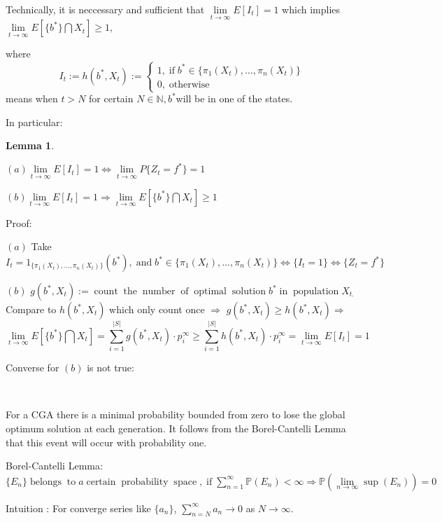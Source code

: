 \documentclass{article}
\newcommand{\assign}{:=}
\newcommand{\tmop}[1]{\ensuremath{\operatorname{#1}}}
\newtheorem{lemma}{Lemma}
{\theorembodyfont{\rmfamily}\newtheorem{note}{Note}}
{\theorembodyfont{\rmfamily}\newtheorem{remark}{Remark}}
\begin{document}
Technically, it is neccessary and sufficient that $\underset{t \rightarrow
\infty}{\lim} E [I_t] = 1$ which implies $\underset{t \rightarrow
\infty}{\lim} E \left[ \{ b^{\ast} \} \bigcap X_t \right] \geqslant 1,$

where
\begin{equation}
  I_t \assign h (b^{\ast}, X_t) \assign \left\{ \begin{array}{l}
    1, \tmop{if} b^{\ast} \in \{ \pi_1 (X_t), \ldots, \pi_n (X_t) \}\\
    0, \tmop{otherwise}
  \end{array} \right.
\end{equation}
means when $t > N$ for certain $N \in \mathbb{N}, b^{\ast} $will be in one of
the states.

In particular:

\begin{lemma}
  \
  
  $(a)  \underset{t \rightarrow \infty}{\lim} E [I_t] = 1 \Leftrightarrow
  \underset{t \rightarrow \infty}{\lim} P \{ Z_t = f^{\ast} \} = 1$
  
  $(b)  \underset{t \rightarrow \infty}{\lim} E [I_t] = 1 \Rightarrow
  \underset{t \rightarrow \infty}{\lim} E \left[ \{ b^{\ast} \} \bigcap X_t
  \right] \geqslant 1$
\end{lemma}

Proof:

$(a)$ Take $I_t = 1_{\{ \pi_1 (X_t), \ldots, \pi_n (X_t) \}} (b^{\ast}),
\tmop{and} b^{\ast} \in \{ \pi_1 (X_t), \ldots, \pi_n (X_t) \} \Leftrightarrow
\{ I_t = 1 \} \Leftrightarrow \{ Z_t = f^{\ast} \}$

$(b)$ $g (b^{\ast}, X_t) \assign \tmop{count} \tmop{the} \tmop{number}
\tmop{of} \tmop{optimal} \tmop{solution} b^{\ast} \tmop{in} \tmop{population}
X_{t.}$ Compare to $h (b^{\ast}, X_t)$ which only count once $\Rightarrow$ $g
(b^{\ast}, X_t) \geqslant h (b^{\ast}, X_t) \Rightarrow$
\begin{equation}
  \underset{t \rightarrow \infty}{\lim} E \left[ \{ b^{\ast} \} \bigcap X_t
  \right] = \sum_{i = 1}^{| S |} g (b^{\ast}, X_t) \cdot p_i^{\infty}
  \geqslant \sum_{i = 1}^{| S |} h (b^{\ast}, X_t) \cdot p_i^{\infty} =
  \underset{t \rightarrow \infty}{\lim} E [I_t] = 1
\end{equation}


Converse for $(b)$ is not true:

\

\begin{remark}
  For a CGA there is a minimal probability bounded from zero to lose the
  global optimum solution at each generation. It follows from the
  Borel-Cantelli Lemma that this event will occur with probability one.
  
  Borel-Cantelli Lemma: $\{ E_n \} \tmop{belongs} \tmop{to} a \tmop{certain}
  \tmop{probability} \tmop{space}, \tmop{if} \sum_{n = 1}^{\infty} \mathbb{P}
  (E_n) < \infty \Rightarrow \mathbb{P} \left( \underset{n \rightarrow
  \infty}{\lim} \sup (E_n) \right) = 0$
  
  Intuition : For converge series like $\{ a_n \}$, $\sum_{n = N}^{\infty} a_n
  \rightarrow 0$ as $N  \rightarrow \infty$.
\end{remark}
\end{document}
